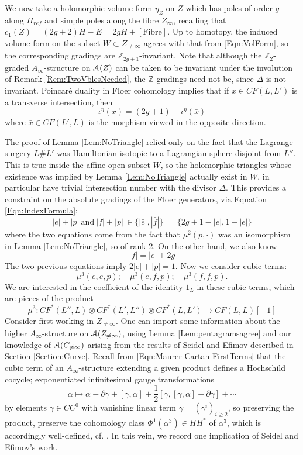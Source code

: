 \documentclass[reqno,10pt]{amsart}
\numberwithin{equation}{section}
\newcommand{\bZ}{{\mathbb Z}}
\newcommand{\scrA}{\EuScript{A}}
\theoremstyle{remark}
\begin{document}
We now take a holomorphic volume form $\eta_Z$ on $Z$ which has poles of order $g$ along $H_{ref}$ and simple poles along the fibre $Z_{\infty}$, recalling that $c_1(Z) = (2g+2)H-E = 2gH + [\textrm{Fibre}]$.  Up to homotopy, the induced volume form on the subset $W \subset Z_{\neq\infty}$ agrees with that from \eqref{Eqn:VolForm}, so the corresponding gradings are $\bZ_{2g+1}$-invariant.  Note that although the $\bZ_2$-graded $A_{\infty}$-structure on $\scrA(Z)$  can  be taken to be invariant under the involution of Remark \ref{Rem:TwoVblesNeeded}, the $\bZ$-gradings need not be, since $\Delta$ is not invariant.   Poincar\'e duality in Floer cohomology implies that if $x \in CF(L,L')$ is a transverse intersection, then 
\[
\iota^{\eta}(x) = (2g+1) - \iota^{\eta}(\bar{x})
\]
where $\bar{x} \in CF(L',L)$ is the morphism viewed in the opposite direction.  



 

 The proof of Lemma \ref{Lem:NoTriangle} relied only on the fact that the Lagrange surgery $L\# L'$ was Hamiltonian isotopic to a Lagrangian sphere disjoint from $L''$.  This is true inside the affine open subset $W$, so the holomorphic triangles whose existence was implied by Lemma \ref{Lem:NoTriangle} actually exist in $W$, in particular have trivial intersection number with the divisor $\Delta$. This provides a constraint on the absolute gradings of the Floer generators, via Equation \ref{Eqn:IndexFormula}:
 \[
|e| + |p| \ \textrm{and} \  |f| + |p| \, \in \{ |\bar{e}|, |\bar{f}|\} \, = \, \{2g+1-|e|, 1-|e|\}
\]
where the two equations come from the fact that $\mu^2(p,\cdot)$ was an isomorphism in Lemma \ref{Lem:NoTriangle}, so of rank 2.  On the other hand, we also know
\[
|f| = |e|+2g
\]
The two previous equations imply $2|e|+|p| =1.$  Now we consider cubic terms:
\begin{equation} \label{Eqn:CubicDegrees}
\mu^3(e,e,p); \quad \mu^3(e,f,p); \quad \mu^3(f,f,p). 
\end{equation}
We are interested in the coefficient of the identity $1_L$ in these cubic terms, which are pieces of the  product
\[
\mu^3: CF^*(L'', L) \otimes CF^*(L', L'') \otimes CF^*(L,L') \longrightarrow CF(L,L)[-1]
\]
Consider first working in $Z_{\neq\infty}$.  One can import some information about the higher $A_{\infty}$-structure on $\scrA(Z_{\neq\infty})$, using Lemma \ref{Lem:pentagramsagree} and our knowledge of $\scrA(C_{\neq\infty})$ arising from the results of Seidel and Efimov described in Section \ref{Section:Curve}.  Recall from \eqref{Eqn:Maurer-Cartan-FirstTerms} that the cubic term of an $A_{\infty}$-structure extending a given product defines a Hochschild cocycle;  exponentiated infinitesimal gauge transformations
\[
\alpha \mapsto \alpha - \partial \gamma + [\gamma,\alpha] + \frac{1}{2} [\gamma, [\gamma,\alpha]-\partial\gamma] + \cdots
\]
by elements $\gamma \in CC^0$ with vanishing linear term $\gamma = (\gamma^i)_{i\geq 2}$, so preserving the product, preserve the cohomology class $\Phi^1(\alpha^3) \in HH^*$ of $\alpha^3$, which is accordingly well-defined, cf. \cite[Eqn. (5.6)]{Seidel:HMSgenus2}. In this vein,  we record one implication of Seidel and Efimov's work.
\end{document}
